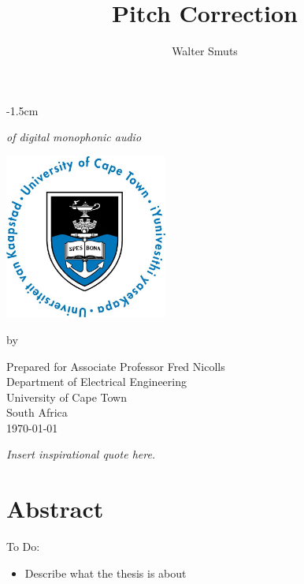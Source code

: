 \documentclass[12pt, twoside, openright]{report}
\title{Pitch Correction}
\author{Walter Smuts}
\makeatletter
\def\cleardoublepage{\clearpage\if@twoside \ifodd\c@page\else
\hbox{}
\vspace*{\fill}
\begin{center}
	\it Insert inspirational quote here.
\end{center}
\vspace{\fill}
\thispagestyle{empty}
\newpage
\if@twocolumn\hbox{}\newpage\fi\fi\fi}
\makeatother
\begin{document}
\makeatletter
\let\TITLE\@title
\makeatother

\begin{titlepage}
\begin{adjustwidth*}{}{-1.5cm} %
\begin{center}
	\vspace*{4cm}

	{\Huge\textbf\thetitle}

	{\it of digital monophonic audio}

	\vspace{0.8cm}
	\includegraphics[width=0.4\textwidth]{UCT.jpg}
	\vspace{0.8cm}


	by \theauthor
	\vspace{0.8cm}

	Prepared for Associate Professor Fred Nicolls\\
	Department of Electrical Engineering\\
	University of Cape Town\\
	South Africa\\
	\vspace{2cm}
	\today
\end{center}
\end{adjustwidth*}
\end{titlepage}
\cleardoublepage

\setcounter{page}{1}

\section*{Abstract}

{\color{red}
To Do:
\begin{itemize}
	\item Describe what the thesis is about
\end{itemize}
\color{black}
}
\end{document}
